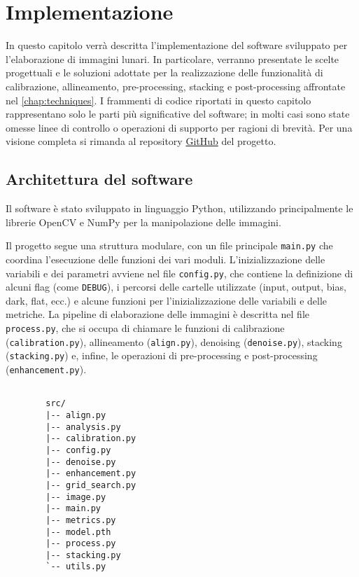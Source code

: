 \chapter{Implementazione} \label{chap:implementation}

In questo capitolo verrà descritta l'implementazione del software sviluppato per l'elaborazione di immagini lunari. In particolare, verranno presentate le scelte progettuali e le soluzioni adottate per la realizzazione delle funzionalità di calibrazione, allineamento, pre-processing, stacking e post-processing affrontate nel \cref{chap:techniques}. I frammenti di codice riportati in questo capitolo rappresentano solo le parti più significative del software; in molti casi sono state omesse linee di controllo o operazioni di supporto per ragioni di brevità. Per una visione completa si rimanda al repository \href{https://github.com/Spina02/Moon-Stacker.git}{GitHub} del progetto.

\section{Architettura del software} \label{sec:architecture}

Il software è stato sviluppato in linguaggio Python, utilizzando principalmente le librerie OpenCV e NumPy per la manipolazione delle immagini.


\begin{multicols}{2}

    Il progetto segue una struttura modulare, con un file principale \texttt{main.py} che coordina l'esecuzione delle funzioni dei vari moduli. L'inizializzazione delle variabili e dei parametri avviene nel file \texttt{config.py}, che contiene la definizione di alcuni flag (come \texttt{DEBUG}), i percorsi delle cartelle utilizzate (input, output, bias, dark, flat, ecc.) e alcune funzioni per l'inizializzazione delle variabili e delle metriche. La pipeline di elaborazione delle immagini è descritta nel file \texttt{process.py}, che si occupa di chiamare le funzioni di calibrazione (\texttt{calibration.py}), allineamento (\texttt{align.py}), denoising (\texttt{denoise.py}), stacking (\texttt{stacking.py}) e, infine, le operazioni di pre-processing e post-processing (\texttt{enhancement.py}).

    \columnbreak

    \begin{verbatim}
         
        src/
        |-- align.py
        |-- analysis.py
        |-- calibration.py
        |-- config.py
        |-- denoise.py
        |-- enhancement.py
        |-- grid_search.py
        |-- image.py
        |-- main.py
        |-- metrics.py
        |-- model.pth
        |-- process.py
        |-- stacking.py
        `-- utils.py
    \end{verbatim}

\end{multicols}

